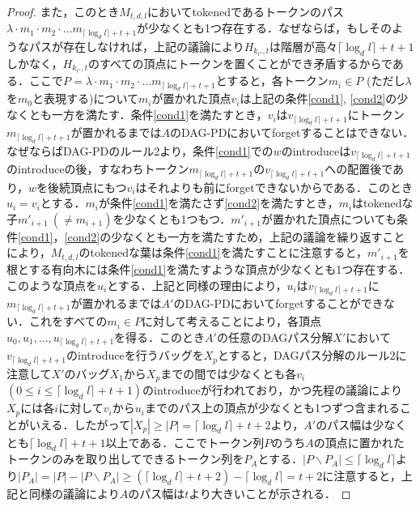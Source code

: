 \documentclass[master]{kuisthesis}		%
\theoremstyle{plain}
\theoremstyle{definition}
\begin{document}
\begin{proof}
また，このとき$M_{t, d, l}$においてtokenedであるトークンのパス$\lambda \cdot m_1 \cdot m_2 \cdot \dots m_{\lceil \log_d l \rceil +t+1}$が少なくとも1つ存在する．なぜならば，もしそのようなパスが存在しなければ，上記の議論により$H_{k_{r'}, t}$は階層が高々$\lceil \log_d l \rceil +t+1$しかなく，$H_{k_{r'}, t}$のすべての頂点にトークンを置くことができ矛盾するからである．ここで$P = \lambda \cdot m_1 \cdot m_2 \cdot \dots m_{\lceil \log_d l \rceil +t+1}$とすると，各トークン$m_i \in P$ (ただし$\lambda$を$m_0$と表現する)について$m_i$が置かれた頂点$v_i$は上記の条件\ref{cond1}, \ref{cond2}の少なくとも一方を満たす．条件\ref{cond1}を満たすとき，$v_i$は$v_{\lceil \log_d l \rceil +t+1}$にトークン$m_{\lceil \log_d l \rceil +t+1}$が置かれるまでは$A$のDAG-PDにおいてforgetすることはできない．なぜならばDAG-PDのルール2より，条件\ref{cond1}での$w$のintroduceは$v_{\lceil \log_d l \rceil +t+1}$のintroduceの後，すなわちトークン$m_{\lceil \log_d l \rceil +t+1}$の$v_{\lceil \log_d l \rceil +t+1}$への配置後であり，$w$を後続頂点にもつ$v_i$はそれよりも前にforgetできないからである．このとき$u_i=v_i$とする．$m_i$が条件\ref{cond1}を満たさず\ref{cond2}を満たすとき，$m_i$はtokenedな子$m'_{i+1}\ (\neq m_{i+1})$を少なくとも1つもつ．$m'_{i+1}$が置かれた頂点についても条件\ref{cond1}，\ref{cond2}の少なくとも一方を満たすため，上記の議論を繰り返すことにより，$M_{t, d, l}$のtokenedな葉は条件\ref{cond1}を満たすことに注意すると，$m'_{i+1}$を根とする有向木には条件\ref{cond1}を満たすような頂点が少なくとも1つ存在する．このような頂点を$u_i$とする．上記と同様の理由により，$u_i$は$v_{\lceil \log_d l \rceil +t+1}$に$m_{\lceil \log_d l \rceil +t+1}$が置かれるまでは$A'$のDAG-PDにおいてforgetすることができない．これをすべての$m_i \in P$に対して考えることにより，各頂点$u_0, u_1, \dots, u_{\lceil \log_d l \rceil +t+1}$を得る．このとき$A'$の任意のDAGパス分解$X'$において$v_{\lceil \log_d l \rceil +t+1}$のintroduceを行うバッグを$X_p$とすると，DAGパス分解のルール2に注意して$X'$のバッグ$X_1$から$X_p$までの間では少なくとも各$v_i$ $(0 \leq i \leq \lceil \log_d l \rceil +t+1)$のintroduceが行われており，かつ先程の議論により$X_p$には各$i$に対して$v_i$から$u_i$までのパス上の頂点が少なくとも1つずつ含まれることがいえる．したがって$|X_p| \geq |P| = \lceil \log_d l \rceil +t+2$より，$A'$のパス幅は少なくとも$\lceil \log_d l \rceil +t+1$以上である．ここでトークン列$P$のうち$A$の頂点に置かれたトークンのみを取り出してできるトークン列を$P_A$とする．$|P \backslash P_A| \leq \lceil \log_d l \rceil$より$|P_A| = |P| - |P \backslash P_A| \geq (\lceil \log_d l \rceil +t+2) - \lceil \log_d l \rceil = t+2$に注意すると，上記と同様の議論により$A$のパス幅は$t$より大きいことが示される．
\end{proof}
\end{document}
